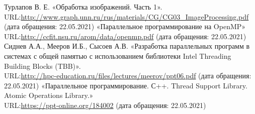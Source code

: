 \documentclass{report}
\begin{document}
\begin{thebibliography}{1}
 Турлапов В. Е. «Обработка изображений. Часть 1».
\\URL:\url {http://www.graph.unn.ru/rus/materials/CG/CG03_ImageProcessing.pdf} (дата обращения: 22.05.2021)
\bibitem{} «Параллельное программирование на OpenMP»
\\URL:\url {http://ccfit.nsu.ru/arom/data/openmp.pdf} (дата обращения: 22.05.2021)
 Сиднев А.А., Мееров И.Б., Сысоев А.В. «Разработка параллельных программ в системах с общей памятью с использованием библиотеки Intel Threading Building Blocks (TBB)».
\\URL:\url {http://hpc-education.ru/files/lectures/meerov/ppt06.pdf} (дата обращения: 22.05.2021)
\bibitem{} «Параллельное программирование. С++. Thread Support Library. Atomic Operations Library.»
\\URL:\url {https://ppt-online.org/184002} (дата обращения: 22.05.2021)
\end{thebibliography}
\newpage
\end{document}
